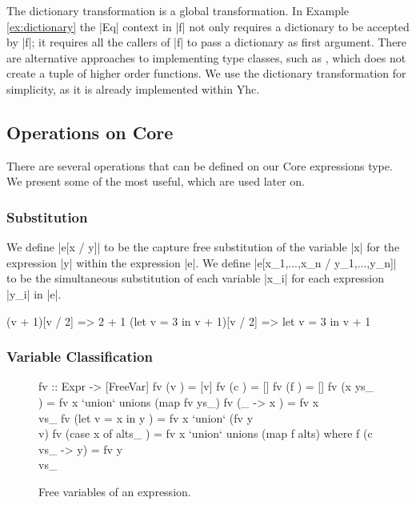 The dictionary transformation is a global transformation. In Example \ref{ex:dictionary} the |Eq| context in |f| not only requires a dictionary to be accepted by |f|; it requires all the callers of |f| to pass a dictionary as first argument. There are alternative approaches to implementing type classes, such as \citet{jones:dictionary_free}, which does not create a tuple of higher order functions. We use the dictionary transformation for simplicity, as it is already implemented within Yhc.

\subsection{Operations on Core}

There are several operations that can be defined on our Core expressions type. We present some of the most useful, which are used later on.

\subsubsection{Substitution}

We define |e[x / y]| to be the capture free substitution of the variable |x| for the expression |y| within the expression |e|. We define |e[x_1,...,x_n / y_1,...,y_n]| to be the simultaneous substitution of each variable |x_i| for each expression |y_i| in |e|.

\begin{example}
\begin{code}
(v + 1)[v / 2]               => 2 + 1
(let v = 3 in v + 1)[v / 2]  => let v = 3 in v + 1
\end{code}
\end{example}

\subsubsection{Variable Classification}

\begin{figure}
\begin{code}
fv :: Expr -> [FreeVar]
fv (v                ) = [v]
fv (c                ) = []
fv (f                ) = []
fv (x ys_            ) = fv x `union` unions (map fv ys_)
fv (\vs_ -> x        ) = fv x \\ vs_
fv (let v = x in y   ) = fv x `union` (fv y \\ v)
fv (case x of alts_  ) = fv x `union` unions (map f alts)
    where f (c vs_ -> y) = fv y \\ vs_
\end{code}
\caption{Free variables of an expression.}
\label{fig:free_variables}
\end{figure}

